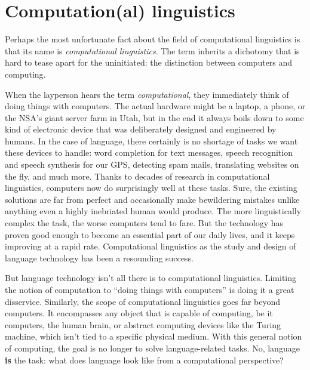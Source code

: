 \chapter{Computation(al) linguistics}
\label{cha:formal}

Perhaps the most unfortunate fact about the field of computational linguistics is that its name is \emph{computational linguistics}.
The term inherits a dichotomy that is hard to tease apart for the uninitiated: the distinction between computers and computing.

When the layperson hears the term \emph{computational}, they immediately think of doing things with computers.
The actual hardware might be a laptop, a phone, or the NSA's giant server farm in Utah, but in the end it always boils down to some kind of electronic device that was deliberately designed and engineered by humans.
In the case of language, there certainly is no shortage of tasks we want these devices to handle: word completion for text messages, speech recognition and speech synthesis for our GPS, detecting spam mails, translating websites on the fly, and much more.
Thanks to decades of research in computational linguistics, computers now do surprisingly well at these tasks.
Sure, the existing solutions are far from perfect and occasionally make bewildering mistakes unlike anything even a highly inebriated human would produce.
The more linguistically complex the task, the worse computers tend to fare.
But the technology has proven good enough to become an essential part of our daily lives, and it keeps improving at a rapid rate.
Computational linguistics as the study and design of language technology has been a resounding success.

But language technology isn't all there is to computational linguistics.
Limiting the notion of computation to ``doing things with computers'' is doing it a great disservice.
Similarly, the scope of computational linguistics goes far beyond computers.
It encompasses any object that is capable of computing, be it computers, the human brain, or abstract computing devices like the Turing machine, which isn't tied to a specific physical medium.
With this general notion of computing, the goal is no longer to solve language-related tasks.
No, language \textbf{is} the task: what does language look like from a computational perspective?


